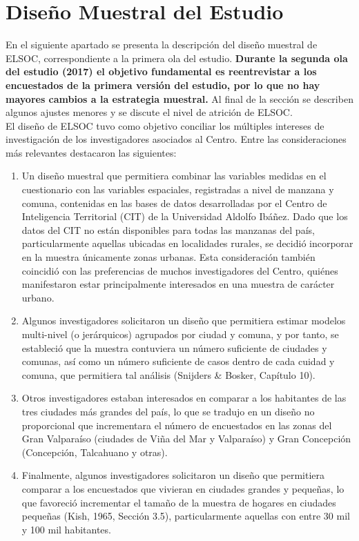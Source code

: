 \documentclass[12pt]{report}
\begin{document}
	
\newpage
\section*{Diseño Muestral del Estudio}

En el siguiente apartado se presenta la descripción del diseño muestral de ELSOC, correspondiente a la primera ola del estudio. \textbf{Durante la segunda ola del estudio (2017) el objetivo fundamental es reentrevistar a los encuestados de la primera versión del estudio, por lo que no hay mayores cambios a la estrategia muestral.} Al final de la sección se describen algunos ajustes menores y se discute el nivel de atrición de ELSOC.\\

El diseño de ELSOC tuvo como objetivo conciliar los múltiples intereses de investigación de los investigadores asociados al Centro. Entre las consideraciones más relevantes destacaron las siguientes:\\
\begin{enumerate}
	\item Un diseño muestral que permitiera combinar las variables medidas en el cuestionario con las variables espaciales, registradas a nivel de manzana y comuna, contenidas en las bases de datos desarrolladas por el Centro de Inteligencia Territorial (CIT) de la Universidad Aldolfo Ibáñez. Dado que los datos del CIT no están disponibles para todas las manzanas del país, particularmente aquellas ubicadas en localidades rurales, se decidió incorporar en la muestra únicamente zonas urbanas. Esta consideración también coincidió con las preferencias de muchos investigadores del Centro, quiénes manifestaron estar principalmente interesados en una muestra de carácter urbano. 
	\item Algunos investigadores solicitaron un diseño que permitiera estimar modelos multi-nivel (o jerárquicos) agrupados por ciudad y comuna, y por tanto, se estableció que la muestra contuviera un número suficiente de ciudades y comunas, así como un número suficiente de casos dentro de cada cuidad y comuna, que permitiera tal análisis (Snijders \& Bosker, Capítulo 10).
	\item Otros investigadores estaban interesados en comparar a los habitantes de las tres ciudades más grandes del país, lo que se tradujo en un diseño no proporcional que incrementara el número de encuestados en las zonas del Gran Valparaíso (ciudades de Viña del Mar y Valparaíso) y Gran Concepción (Concepción, Talcahuano y otras).
	\item Finalmente, algunos investigadores solicitaron un diseño que permitiera comparar a los encuestados que vivieran en ciudades grandes y pequeñas, lo que favoreció incrementar el tamaño de la muestra de hogares en ciudades pequeñas (Kish, 1965, Sección 3.5), particularmente aquellas con entre 30 mil y 100 mil habitantes.
\end{enumerate}
\vspace{0.5cm}
\end{document}
